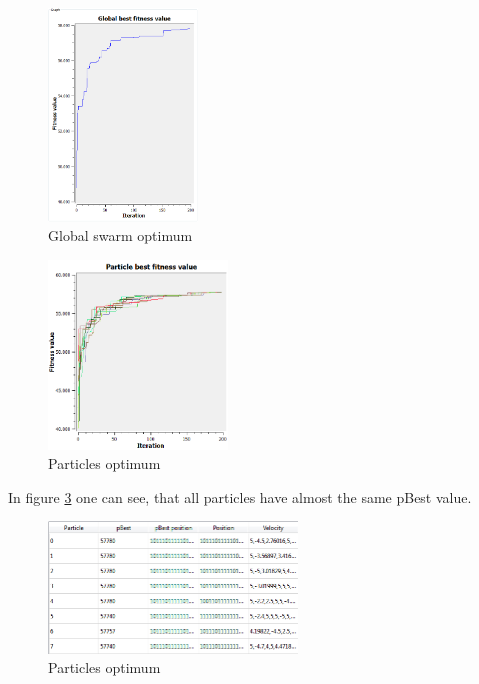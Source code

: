 \documentclass{article}
\begin{document}
\begin{figure}[H]
    \centering
    \includegraphics[width=150px]{images/p30_200it_p1.PNG}
    \caption{Global swarm optimum}
    \label{fig-p30_200it_p1}
\end{figure}

\begin{figure}[H]
    \centering
    \includegraphics[width=180px]{images/p30_200it_p1_particles.PNG}
    \caption{Particles optimum}
    \label{fig-p30_200it_p1_particles}
\end{figure}

In figure \ref{fig-particles_optimum} one can see, that all particles have almost the same pBest value.

\begin{figure}[H]
    \centering
    \includegraphics[width=250px]{images/particles_optimum.PNG}
    \caption{Particles optimum}
    \label{fig-particles_optimum}
\end{figure}
\end{document}
